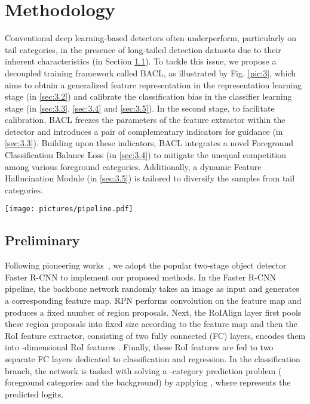 \documentclass[lettersize,journal]{IEEEtran}
\begin{document}
\section{Methodology}

Conventional deep learning-based detectors often underperform, particularly on tail categories, in the presence of long-tailed detection datasets due to their inherent characteristics (in Section \ref{sec:3.1}).
To tackle this issue, we propose a decoupled training framework called BACL, as illustrated by Fig. \ref{pic:3}, which aims to obtain a generalized feature representation in the representation learning stage (in \ref{sec:3.2}) and calibrate the classification bias in the classifier learning stage (in \ref{sec:3.3}, \ref{sec:3.4} and \ref{sec:3.5}). 
In the second stage, to facilitate calibration, BACL freezes the parameters of the feature extractor within the detector and introduces a pair of complementary indicators for guidance (in \ref{sec:3.3}).
Building upon these indicators, BACL integrates a novel Foreground Classification Balance Loss (in \ref{sec:3.4}) to mitigate the unequal competition among various foreground categories.
Additionally, a dynamic Feature Hallucination Module (in \ref{sec:3.5}) is tailored to diversify the samples from tail categories.

\begin{figure*}
  \centering
  \texttt{[image: pictures/pipeline.pdf]}
  \caption{Overall framework of the proposed BACL. In the first stage (left panel), the entire object detector is trained on the long-tailed dataset for 12 epochs. In the second stage (right panel), we freeze the parameters of the feature extractor (green blocks), and fine-tune other parts (blue blocks) with our proposed foreground classification balance loss and feature hallucination module for another 12 epochs. Notably, LTI and STI stand for long-term indicators and short-term indicators, respectively.}
  \label{pic:3}
\end{figure*}





\subsection{Preliminary}\label{sec:3.1}

Following pioneering works~\cite{li2020overcoming, wang2021adaptive}, we adopt the popular two-stage object detector Faster R-CNN to implement our proposed methods.
In the Faster R-CNN pipeline, the backbone network randomly takes an image as input and generates a corresponding feature map.
RPN performs convolution on the feature map and produces a fixed number of region proposals.
Next, the RoIAlign layer first pools these region proposals into fixed size according to the feature map and then the RoI feature extractor, consisting of two fully connected (FC) layers, encodes them into -dimensional RoI features .
Finally, these RoI features are fed to two separate FC layers dedicated to classification and regression.
In the classification branch, the network is tasked with solving a -category prediction problem ( foreground categories and the background) by applying , where  represents the predicted logits.
\end{document}

